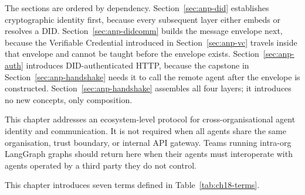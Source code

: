 The sections are ordered by dependency. Section~\ref{sec:anp-did}
establishes cryptographic identity first, because every subsequent layer
either embeds or resolves a DID. Section~\ref{sec:anp-didcomm} builds the
message envelope next, because the Verifiable Credential introduced in
Section~\ref{sec:anp-vc} travels inside that envelope and cannot be taught
before the envelope exists. Section~\ref{sec:anp-auth} introduces
DID-authenticated HTTP, because the capstone in
Section~\ref{sec:anp-handshake} needs it to call the remote agent after the
envelope is constructed. Section~\ref{sec:anp-handshake} assembles all
four layers; it introduces no new concepts, only composition.

\begin{notebox}
This chapter addresses an ecosystem-level protocol for cross-organisational
agent identity and communication. It is not required when all agents share
the same organisation, trust boundary, or internal API gateway. Teams
running intra-org LangGraph graphs should return here when their agents
must interoperate with agents operated by a third party they do not control.
\end{notebox}

This chapter introduces seven terms defined in Table~\ref{tab:ch18-terms}.

